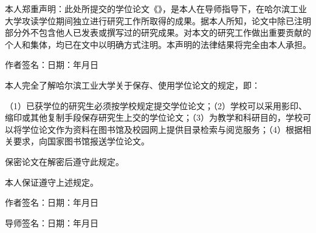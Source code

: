 
\vspace{\baselineskip}
\begin{center}\hei{}\end{center}
\vspace{1em}

本人郑重声明：此处所提交的学位论文《\chinesethesistitle》，是本人在导师指导下，在哈尔滨工业大学攻读学位期间独立进行研究工作所取得的成果。据本人所知，论文中除已注明部分外不包含他人已发表或撰写过的研究成果。对本文的研究工作做出重要贡献的个人和集体，均已在文中以明确方式注明。本声明的法律结果将完全由本人承担。

\vspace{\baselineskip}
\hspace{6em}作者签名：\hfill 日期：\hspace{2.5em}年\hspace{1.5em}月\hspace{1.5em}日

\vspace{3\baselineskip}
\begin{center}\hei{}\end{center}
\vspace{1em}

本人完全了解哈尔滨工业大学关于保存、使用学位论文的规定，即：

（1）已获学位的研究生必须按学校规定提交学位论文；（2）学校可以采用影印、缩印或其他复制手段保存研究生上交的学位论文；（3）为教学和科研目的，学校可以将学位论文作为资料在图书馆及校园网上提供目录检索与阅览服务；（4）根据相关要求，向国家图书馆报送学位论文。

保密论文在解密后遵守此规定。
\vspace{\baselineskip}

本人保证遵守上述规定。

\vspace{2\baselineskip}
\hspace{6em}作者签名：\hfill 日期：\hspace{2.5em}年\hspace{1.5em}月\hspace{1.5em}日

\vspace{2\baselineskip}
\hspace{6em}导师签名：\hfill 日期：\hspace{2.5em}年\hspace{1.5em}月\hspace{1.5em}日